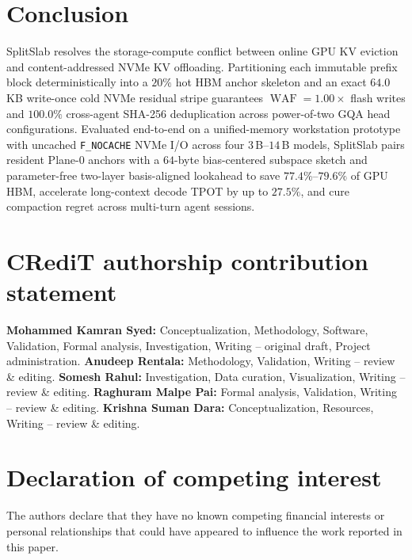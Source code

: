 \documentclass[final,5p,times,twocolumn]{elsarticle}
\theoremstyle{definition}
\theoremstyle{remark}
\newcommand{\SplitSlab}{\textup{\textsc{SplitSlab}}}
\newcommand{\WAF}{\operatorname{WAF}}
\def\SplitSlab{SplitSlab}%
\begin{document}
\section{Conclusion}\label{sec:conclusion}

\SplitSlab{} resolves the storage-compute conflict between online GPU KV eviction and content-addressed NVMe KV offloading. Partitioning each immutable prefix block deterministically into a $20\%$ hot HBM anchor skeleton and an exact $64.0$\,KB write-once cold NVMe residual stripe guarantees $\WAF = 1.00\times$ flash writes and $100.0\%$ cross-agent SHA-256 deduplication across power-of-two GQA head configurations. Evaluated end-to-end on a unified-memory workstation prototype with uncached \texttt{F\_NOCACHE} NVMe I/O across four $3$\,B--$14$\,B models, \SplitSlab{} pairs resident Plane-0 anchors with a $64$-byte bias-centered subspace sketch and parameter-free two-layer basis-aligned lookahead to save $77.4\%$--$79.6\%$ of GPU HBM, accelerate long-context decode TPOT by up to $27.5\%$, and cure compaction regret across multi-turn agent sessions.

\section*{CRediT authorship contribution statement}
\textbf{Mohammed Kamran Syed:} Conceptualization, Methodology, Software, Validation, Formal analysis, Investigation, Writing -- original draft, Project administration.
\textbf{Anudeep Rentala:} Methodology, Validation, Writing -- review \& editing.
\textbf{Somesh Rahul:} Investigation, Data curation, Visualization, Writing -- review \& editing.
\textbf{Raghuram Malpe Pai:} Formal analysis, Validation, Writing -- review \& editing.
\textbf{Krishna Suman Dara:} Conceptualization, Resources, Writing -- review \& editing.

\section*{Declaration of competing interest}
The authors declare that they have no known competing financial interests or personal relationships that could have appeared to influence the work reported in this paper.
\end{document}
